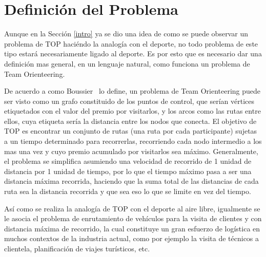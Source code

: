 \section{Definici\'on del Problema}\label{define}
Aunque en la Secci\'on \ref{intro} ya se dio una idea de como se puede observar un problema de TOP haci\'endo la analog\'ia con el deporte, no todo problema de este tipo estar\'a necesariamente ligado al deporte. Es por esto que es necesario dar una definici\'on mas general, en un lenguaje natural, como funciona un problema de Team Orienteering.

De acuerdo a como Boussier~\cite{exactAlgorithm} lo define, un problema de Team Orienteering puede ser visto como un grafo constituido de los puntos de control, que ser\'ian v\'ertices etiquetados con el valor del premio por visitarlos, y los arcos como las rutas entre ellos, cuya etiqueta ser\'ia la distancia entre los nodos que conecta. El objetivo de TOP es encontrar un conjunto de rutas (una ruta por cada participante) sujetas a un tiempo determinado para recorrerlas, recorriendo cada nodo intermedio a los mas una vez y cuyo premio acumulado por visitarlos sea m\'aximo. Generalmente, el problema se simplifica asumiendo una velocidad de recorrido de 1 unidad de distancia por 1 unidad de tiempo, por lo que el tiempo m\'aximo pasa a ser una distancia m\'axima recorrida, haciendo que la suma total de las distancias de cada ruta sea la distancia recorrida y que sea eso lo que se limite en vez del tiempo.

As\'i como se realiza la analog\'ia de TOP con el deporte al aire libre, igualmente se le asocia el problema de enrutamiento de veh\'iculos para la visita de clientes y con distancia m\'axima de recorrido, la cual constituye un gran esfuerzo de log\'istica en muchos contextos de la industria actual, como por ejemplo la visita de t\'ecnicos a clientela, planificaci\'on de viajes tur\'isticos, etc.

